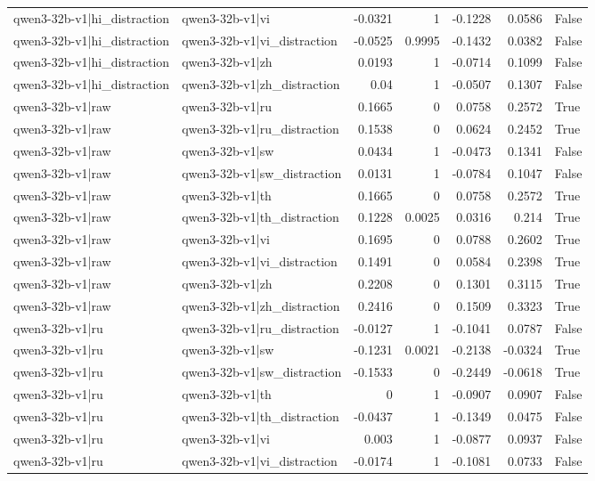 \begin{table}
\begin{tabular}{l l r r r r l}
qwen3-32b-v1|hi_distraction & qwen3-32b-v1|vi & -0.0321 & 1 & -0.1228 & 0.0586 & False \\
qwen3-32b-v1|hi_distraction & qwen3-32b-v1|vi_distraction & -0.0525 & 0.9995 & -0.1432 & 0.0382 & False \\
qwen3-32b-v1|hi_distraction & qwen3-32b-v1|zh & 0.0193 & 1 & -0.0714 & 0.1099 & False \\
qwen3-32b-v1|hi_distraction & qwen3-32b-v1|zh_distraction & 0.04 & 1 & -0.0507 & 0.1307 & False \\
qwen3-32b-v1|raw & qwen3-32b-v1|ru & 0.1665 & 0 & 0.0758 & 0.2572 & True \\
qwen3-32b-v1|raw & qwen3-32b-v1|ru_distraction & 0.1538 & 0 & 0.0624 & 0.2452 & True \\
qwen3-32b-v1|raw & qwen3-32b-v1|sw & 0.0434 & 1 & -0.0473 & 0.1341 & False \\
qwen3-32b-v1|raw & qwen3-32b-v1|sw_distraction & 0.0131 & 1 & -0.0784 & 0.1047 & False \\
qwen3-32b-v1|raw & qwen3-32b-v1|th & 0.1665 & 0 & 0.0758 & 0.2572 & True \\
qwen3-32b-v1|raw & qwen3-32b-v1|th_distraction & 0.1228 & 0.0025 & 0.0316 & 0.214 & True \\
qwen3-32b-v1|raw & qwen3-32b-v1|vi & 0.1695 & 0 & 0.0788 & 0.2602 & True \\
qwen3-32b-v1|raw & qwen3-32b-v1|vi_distraction & 0.1491 & 0 & 0.0584 & 0.2398 & True \\
qwen3-32b-v1|raw & qwen3-32b-v1|zh & 0.2208 & 0 & 0.1301 & 0.3115 & True \\
qwen3-32b-v1|raw & qwen3-32b-v1|zh_distraction & 0.2416 & 0 & 0.1509 & 0.3323 & True \\
qwen3-32b-v1|ru & qwen3-32b-v1|ru_distraction & -0.0127 & 1 & -0.1041 & 0.0787 & False \\
qwen3-32b-v1|ru & qwen3-32b-v1|sw & -0.1231 & 0.0021 & -0.2138 & -0.0324 & True \\
qwen3-32b-v1|ru & qwen3-32b-v1|sw_distraction & -0.1533 & 0 & -0.2449 & -0.0618 & True \\
qwen3-32b-v1|ru & qwen3-32b-v1|th & 0 & 1 & -0.0907 & 0.0907 & False \\
qwen3-32b-v1|ru & qwen3-32b-v1|th_distraction & -0.0437 & 1 & -0.1349 & 0.0475 & False \\
qwen3-32b-v1|ru & qwen3-32b-v1|vi & 0.003 & 1 & -0.0877 & 0.0937 & False \\
qwen3-32b-v1|ru & qwen3-32b-v1|vi_distraction & -0.0174 & 1 & -0.1081 & 0.0733 & False \\

\end{tabular}
\end{table}
